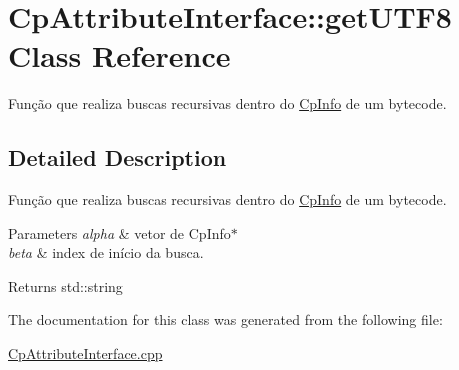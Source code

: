 \hypertarget{class_cp_attribute_interface_1_1get_u_t_f8}{}\section{Cp\+Attribute\+Interface\+:\+:get\+U\+T\+F8 Class Reference}
\label{class_cp_attribute_interface_1_1get_u_t_f8}


Função que realiza buscas recursivas dentro do \hyperlink{class_cp_info}{Cp\+Info} de um bytecode.  




\subsection{Detailed Description}
Função que realiza buscas recursivas dentro do \hyperlink{class_cp_info}{Cp\+Info} de um bytecode. 


\begin{DoxyParams}{Parameters}
{\em alpha} & vetor de Cp\+Info$\ast$ \\
\hline
{\em beta} & index de início da busca. \\
\hline
\end{DoxyParams}
\begin{DoxyReturn}{Returns}
std\+::string 
\end{DoxyReturn}


The documentation for this class was generated from the following file\+:\begin{DoxyCompactItemize}
\item 
\hyperlink{_cp_attribute_interface_8cpp}{Cp\+Attribute\+Interface.\+cpp}\end{DoxyCompactItemize}
